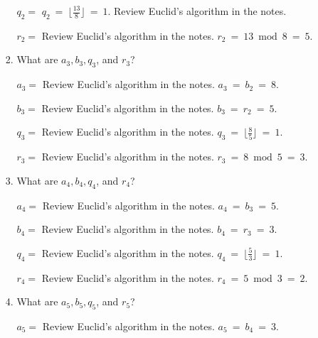 \documentclass[11pt, preview]{standalone} %
\begin{document}
\begin{enumerate}
\begin{enumerate}
\begin{enumerate}
\begin{Freeform}{1}
$q_2 = $
\Solution $q_2\ =\ \lfloor \frac{13}{8} \rfloor\ =\ 1$.
\Hint Review Euclid's algorithm in the notes.
\end{Freeform}
\begin{Freeform}{5}
$r_2 = $
\Hint Review Euclid's algorithm in the notes.
\Solution $r_2\ =\ 13 \bmod 8\ =\ 5$.
\end{Freeform}
\item What are $a_3, b_3, q_3$, and $r_3$?
\begin{Freeform}{8}
$a_3 = $
\Hint Review Euclid's algorithm in the notes.
\Solution $a_3\ =\ b_2\ =\ 8$.
\end{Freeform}
\begin{Freeform}{5}
$b_3 = $
\Hint Review Euclid's algorithm in the notes.
\Solution $b_3\ =\ r_2\ =\ 5$.
\end{Freeform}
\begin{Freeform}{1}
$q_3 = $
\Hint Review Euclid's algorithm in the notes.
\Solution $q_3\ =\ \lfloor \frac{8}{5} \rfloor\ =\ 1$.
\end{Freeform}
\begin{Freeform}{3}
$r_3 = $
\Hint Review Euclid's algorithm in the notes.
\Solution $r_3\ =\ 8 \bmod 5\ =\ 3$.
\end{Freeform}
\item What are $a_4, b_4, q_4$, and $r_4$?
\begin{Freeform}{5}
$a_4 = $
\Hint Review Euclid's algorithm in the notes.
\Solution $a_4\ =\ b_3\ =\ 5$.
\end{Freeform}
\begin{Freeform}{3}
$b_4 = $
\Hint Review Euclid's algorithm in the notes.
\Solution $b_4\ =\ r_3\ =\ 3$.
\end{Freeform}
\begin{Freeform}{1}
$q_4 = $
\Hint Review Euclid's algorithm in the notes.
\Solution $q_4\ =\ \lfloor \frac{5}{3} \rfloor\ =\ 1$.
\end{Freeform}
\begin{Freeform}{2}
$r_4 = $
\Hint Review Euclid's algorithm in the notes.
\Solution $r_4\ =\ 5 \bmod 3\ =\ 2$.
\end{Freeform}
\item What are $a_5, b_5, q_5$, and $r_5$?
\begin{Freeform}{3}
$a_5 = $
\Hint Review Euclid's algorithm in the notes.
\Solution $a_5\ =\ b_4\ =\ 3$.
\end{Freeform}
\begin{Freeform}{2}

\end{Freeform}
\end{enumerate}
\end{enumerate}
\end{enumerate}
\end{document}
